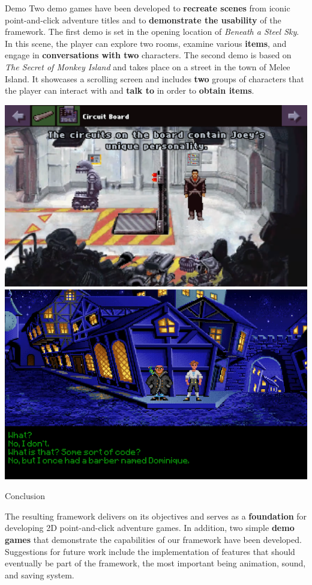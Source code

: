 \documentclass[portrait,a0paper,fontscale=0.35]{baposter}
\begin{document}
\begin{poster}
\begin{posterbox}[column=1, name=result2, below=ds]{Demo}
Two demo games have been developed to \textbf{recreate scenes} from iconic point-and-click adventure titles and to \textbf{demonstrate the usability} of the framework. The first demo is set in the opening location of \textit{Beneath a Steel Sky}. In this scene, the player can explore two rooms, examine various \textbf{items}, and engage in \textbf{conversations with two }characters. The second demo is based on \textit{The Secret of Monkey Island} and takes place on a street in the town of Melee Island. It showcases a scrolling screen and includes \textbf{two} groups of characters that the player can interact with and \textbf{talk to} in order to \textbf{obtain items}. 
\begin{center}
\includegraphics[width=0.506\linewidth]{img/manual.png}
\includegraphics[width=0.486\linewidth]{img/manual-tsomi.png}
\end{center}
\end{posterbox}


\begin{posterbox}[column=1, name=conclusion, below=result2, headerColorOne=yellow!80!orange!95!black, boxColorOne=yellow!33]{Conclusion}


The resulting framework delivers on its objectives and serves as a \textbf{foundation} for developing 2D point-and-click adventure games. In addition, two simple \textbf{demo games} that demonstrate the capabilities of our framework have been developed. Suggestions for future work include the implementation of features that should eventually be part of the framework, the most important being animation, sound, and saving system. 


\end{posterbox}
\end{poster}
\end{document}
